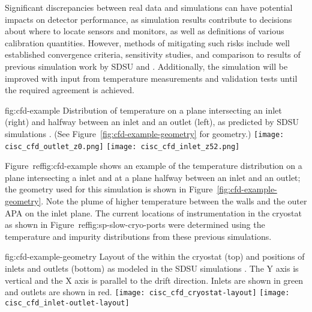 
Significant discrepancies between real data and simulations can have potential impacts on detector performance, as simulation results contribute to decisions about where to locate sensors and monitors, as well as definitions of various calibration quantities. However, methods of mitigating such risks include well established convergence criteria, sensitivity studies, and comparison to results of previous  simulation work by SDSU and \fnal. Additionally, the simulation will be improved with input from temperature measurements and validation tests until the required agreement is achieved.

\begin{dunefigure}{fig:cfd-example}
  {Distribution of temperature on a plane intersecting an inlet (right) and halfway between an inlet and an outlet (left), as predicted by SDSU  simulations \cite{docdb-5915}. (See Figure\ \ref{fig:cfd-example-geometry} for geometry.)}
  \texttt{[image: cisc\_cfd\_outlet\_z0.png]}
  \texttt{[image: cisc\_cfd\_inlet\_z52.png]}
\end{dunefigure}

Figure~ref{fig:cfd-example} shows an example of the temperature
distribution on a plane intersecting a  inlet and at a
plane halfway between an inlet and an outlet; the geometry used for
this simulation is shown in Figure\ \ref{fig:cfd-example-geometry}.
Note the plume of higher temperature  between the walls and
the outer APA on the inlet plane.  The current locations of instrumentation in
the cryostat as shown in Figure~ref{fig:sp-slow-cryo-ports} were
determined using the temperature and impurity distributions from these
previous simulations.

\begin{dunefigure}{fig:cfd-example-geometry}
  {Layout of the  within the cryostat (top) and positions of
     inlets and outlets (bottom) as modeled in the SDSU
     simulations \cite{docdb-5915}.
    The Y axis is vertical and the X axis is parallel to the 
    drift direction.
    Inlets are shown in green and outlets are shown in red.}
  \texttt{[image: cisc\_cfd\_cryostat-layout]}
  \texttt{[image: cisc\_cfd\_inlet-outlet-layout]}
\end{dunefigure}

